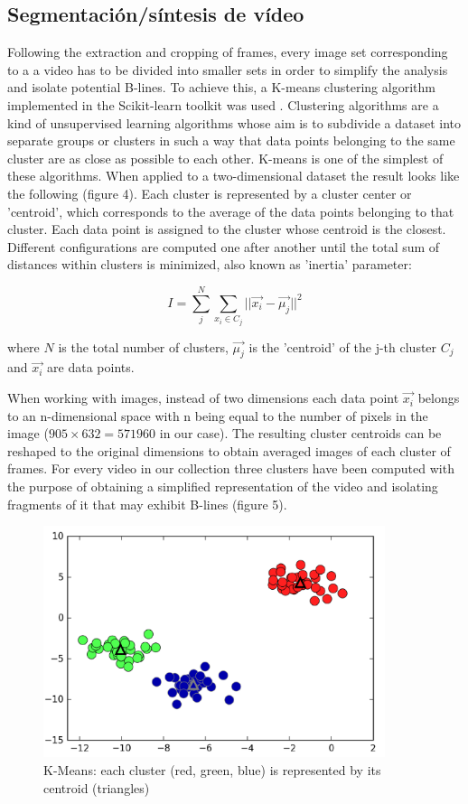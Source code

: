 \documentclass[11pt]{article} %
\begin{document}
\subsection{Segmentación/síntesis de vídeo}

	Following the extraction and cropping of frames, every image set corresponding to a a video has to be divided into smaller sets in order to simplify the analysis and isolate potential B-lines. To achieve this, a K-means clustering algorithm implemented in the Scikit-learn toolkit was used \cite{sklearn}. Clustering algorithms are a kind of unsupervised learning algorithms whose aim is to subdivide a dataset into separate groups or clusters in such a way that data points belonging to the same cluster are as close as possible to each other. K-means is one of the simplest of these algorithms. When applied to a two-dimensional dataset the result looks like the following (figure 4)\cite{python}. Each cluster is represented by a cluster center or 'centroid', which corresponds to the average of the data points belonging to that cluster. Each data point is assigned to the cluster whose centroid is the closest. Different configurations are computed one after another until the total sum of distances within clusters is minimized, also known as 'inertia' parameter:
	
	\[ I = \sum_j^N \sum_{x_i \in C_j} || \vec{x_i} - \vec{ \mu_j} ||^2 \]
	
	where $N$ is the total number of clusters, $\vec{\mu_j}$ is the 'centroid' of the j-th cluster $C_j$ and $\vec{x_i}$ are data points.
	
	When working with images, instead of two dimensions each data point $\vec{x_i}$ belongs to an n-dimensional space with n being equal to the number of pixels in the image ($905 \times 632=571960$ in our case). The resulting cluster centroids can be reshaped to the original dimensions to obtain averaged images of each cluster of frames. For every video in our collection three clusters have been computed with the purpose of obtaining a simplified representation of the video and isolating fragments of it that may exhibit B-lines (figure 5). 
	
	\begin{figure}
	\centering
	\includegraphics[width=10cm]{figuras/clusters.png}
	\caption{K-Means: each cluster (red, green, blue) is represented by its centroid (triangles)\cite{python}}
	\end{figure}
	
\end{document}
